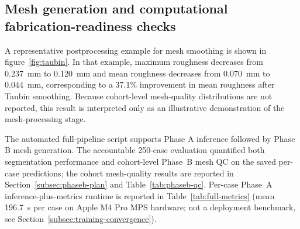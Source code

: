 \documentclass[anonymous]{iopjournal}
\begin{document}
\subsection{Mesh generation and computational fabrication-readiness checks}
\label{subsec:mesh-results}

A representative postprocessing example for mesh smoothing is shown in figure~\ref{fig:taubin}. In that example, maximum roughness decreases from \SI{0.237}{mm} to \SI{0.120}{mm} and mean roughness decreases from \SI{0.070}{mm} to \SI{0.044}{mm}, corresponding to a 37.1\% improvement in mean roughness after Taubin smoothing. Because cohort-level mesh-quality distributions are not reported, this result is interpreted only as an illustrative demonstration of the mesh-processing stage.

The automated full-pipeline script supports Phase A inference followed by Phase B mesh generation. The accountable 250-case evaluation quantified both segmentation performance and cohort-level Phase~B mesh QC on the saved per-case predictions; the cohort mesh-quality results are reported in Section~\ref{subsec:phaseb-plan} and Table~\ref{tab:phaseb-qc}. Per-case Phase~A inference-plus-metrics runtime is reported in Table~\ref{tab:full-metrics} (mean \SI{196.7}{s} per case on Apple M4 Pro MPS hardware; not a deployment benchmark, see Section~\ref{subsec:training-convergence}).
\end{document}
